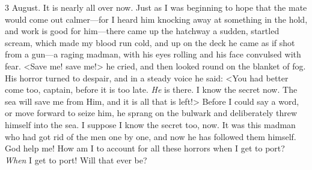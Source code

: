 \begin{diary}{3 August.}
It is nearly all over now. Just as I was beginning to hope that the mate would come out calmer—for I heard him knocking away at something in the hold, and work is good for him—there came up the hatchway a sudden, startled scream, which made my blood run cold, and up on the deck he came as if shot from a gun—a raging madman, with his eyes rolling and his face convulsed with fear. <Save me! save me!> he cried, and then looked round on the blanket of fog. His horror turned to despair, and in a steady voice he said: <You had better come too, captain, before it is too late. \textit{He} is there. I know the secret now. The sea will save me from Him, and it is all that is left!> Before I could say a word, or move forward to seize him, he sprang on the bulwark and deliberately threw himself into the sea. I suppose I know the secret too, now. It was this madman who had got rid of the men one by one, and now he has followed them himself. God help me! How am I to account for all these horrors when I get to port? \textit{When} I get to port! Will that ever be?
\end{diary}
 
